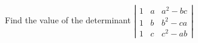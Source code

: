 
%
%
%
%
% 
% 

\question Find the value of the determinant 
$\left|
  \begin{array}{ccc}
    1 & a & a^2-bc \\
    1 & b & b^2-ca \\
    1 & c & c^2-ab
  \end{array}
\right|
$

\insertQR{}

\ifprintanswers
\fi 

